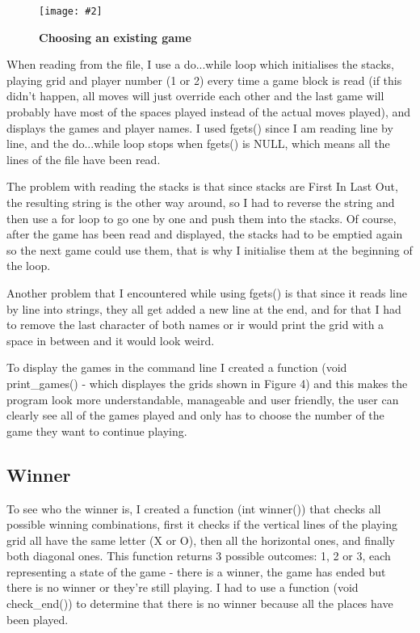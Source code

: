\documentclass[10pt, a4paper]{article}
\newcommand{\figuremacro}[5]{
    \begin{figure}[#1]
        \centering
        \texttt{[image: \#2]}
        \caption[#3]{\textbf{#3}#4}
        \label{fig:#2}
    \end{figure}
}
\begin{document}
\figuremacro{h}{choose}{Choosing an existing game}{}{1}

When reading from the file, I use a do...while loop which initialises the stacks, playing grid and player number (1 or 2) every time a game block is read (if this didn't happen, all moves will just override each other and the last game will probably have most of the spaces played instead of the actual moves played), and displays the games and player names. I used fgets() since I am reading line by line, and the do...while loop stops when fgets() is NULL, which means all the lines of the file have been read.

The problem with reading the stacks is that since stacks are First In Last Out, the resulting string is the other way around, so I had to reverse the string and then use a for loop to go one by one and push them into the stacks. Of course, after the game has been read and displayed, the stacks had to be emptied again so the next game could use them, that is why I initialise them at the beginning of the loop.

Another problem that I encountered while using fgets() is that since it reads line by line into strings, they all get added a new line at the end, and for that I had to remove the last character of both names or ir would print the grid with a space in between and it would look weird.

To display the games in the command line I created a function (void print\_games() - which displayes the grids shown in Figure 4) and this makes the program look more understandable, manageable and user friendly, the user can clearly see all of the games played and only has to choose the number of the game they want to continue playing.

    \subsection{Winner}

To see who the winner is, I created a function (int winner()) that checks all possible winning combinations, first it checks if the vertical lines of the playing grid all have the same letter (X or O), then all the horizontal ones, and finally both diagonal ones. This function returns 3 possible outcomes: 1, 2 or 3, each representing a state of the game - there is a winner, the game has ended but there is no winner or they're still playing. I had to use a function (void check\_end()) to determine that there is no winner because all the places have been played.
\end{document}
